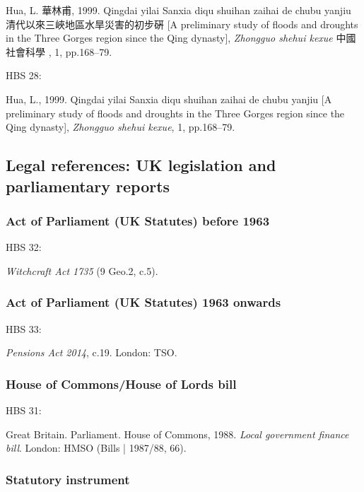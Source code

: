 Hua, L. 華林甫, 1999.  Qingdai yilai Sanxia diqu shuihan zaihai de chubu yanjiu 清代以來三峽地區水旱災害的初步硏 [A preliminary study of floods and droughts in the Three Gorges region since the Qing dynasty], \emph{Zhongguo shehui kexue} 中國社會科學 , 1, pp.168--79.


HBS 28: \cite{hua1999qys2}

Hua, L., 1999. Qingdai yilai Sanxia diqu shuihan zaihai de chubu yanjiu [A preliminary study of floods and droughts in the Three Gorges region since the Qing dynasty], \emph{Zhongguo shehui kexue}, 1, pp.168--79.



\subsection{Legal references: UK legislation and parliamentary reports}


\subsubsection*{Act of Parliament (UK Statutes) before 1963}

HBS 32: \cite{gb.wa1735}

\emph{Witchcraft Act 1735} (9 Geo.2, c.5).



\subsubsection*{Act of Parliament (UK Statutes) 1963 onwards}

HBS 33: \cite{gb.pa2014}

\emph{Pensions Act 2014}, c.19. London: TSO.



\subsubsection*{House of Commons/House of Lords bill}

HBS 31: \cite{gb.bill1987/88-66}

Great Britain. Parliament. House of Commons, 1988. \emph{Local government finance bill}. London: HMSO (Bills | 1987/88, 66).




\subsubsection*{Statutory instrument}


